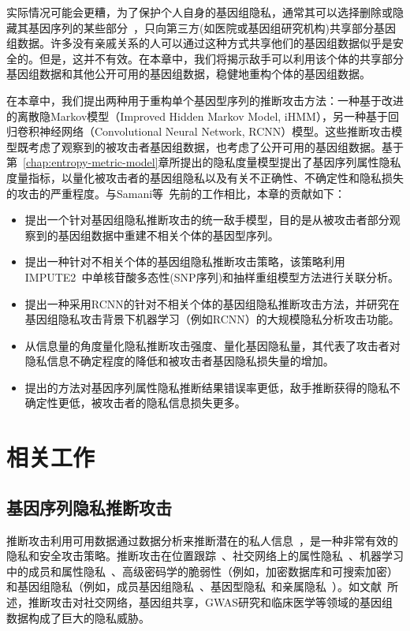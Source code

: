 实际情况可能会更糟，为了保护个人自身的基因组隐私，通常其可以选择删除或隐藏其基因序列的某些部分~\cite{shi2017overview}，只向第三方(如医院或基因组研究机构)共享部分基因组数据。许多没有亲戚关系的人可以通过这种方式共享他们的基因组数据似乎是安全的。但是，这并不有效。在本章中，我们将揭示敌手可以利用该个体的共享部分基因组数据和其他公开可用的基因组数据，稳健地重构个体的基因组数据。

在本章中，我们提出两种用于重构单个基因型序列的推断攻击方法：一种基于改进的离散隐Markov模型（Improved Hidden Markov Model, iHMM），另一种基于回归卷积神经网络（Convolutional Neural Network, RCNN）模型。这些推断攻击模型既考虑了观察到的被攻击者基因组数据，也考虑了公开可用的基因组数据。基于第~\ref{chap:entropy-metric-model}章所提出的隐私度量模型提出了基因序列属性隐私度量指标，以量化被攻击者的基因组隐私以及有关不正确性、不确定性和隐私损失的攻击的严重程度。与Samani等~\cite{samani2015quantifying}先前的工作相比，本章的贡献如下：
\begin{itemize}
	\item 提出一个针对基因组隐私推断攻击的统一敌手模型，目的是从被攻击者部分观察到的基因组数据中重建不相关个体的基因型序列。
	\item 提出一种针对不相关个体的基因组隐私推断攻击策略，该策略利用IMPUTE2~\cite{howie2009flexible}中单核苷酸多态性(SNP序列)和抽样重组模型方法进行关联分析。
	\item 提出一种采用RCNN的针对不相关个体的基因组隐私推断攻击方法，并研究在基因组隐私攻击背景下机器学习（例如RCNN）的大规模隐私分析攻击功能。
	\item 从信息量的角度量化隐私推断攻击强度、量化基因隐私量，其代表了攻击者对隐私信息不确定程度的降低和被攻击者基因隐私损失量的增加。
	\item 提出的方法对基因序列属性隐私推断结果错误率更低，敌手推断获得的隐私不确定性更低，被攻击者的隐私信息损失更多。
\end{itemize}

\section{相关工作}\label{sec:relat}
\subsection{基因序列隐私推断攻击}

推断攻击利用可用数据通过数据分析来推断潜在的私人信息~\cite{en2018inference}，是一种非常有效的隐私和安全攻击策略。推断攻击在位置跟踪~\cite{narain2016inferring}、社交网络上的属性隐私~\cite{gong2016you}、机器学习中的成员和属性隐私~\cite{shokri2017membership,ganju2018property}、高级密码学的脆弱性（例如，加密数据库和可搜索加密）~\cite{pouliot2016shadow} 和基因组隐私（例如，成员基因组隐私~\cite{wang2009learning}、基因型隐私~\cite{samani2015quantifying,he2017addressing}和亲属隐私~\cite{humbert2013addressing}）。如文献~\cite{ayday2017inference}所述，推断攻击对社交网络，基因组共享，GWAS研究和临床医学等领域的基因组数据构成了巨大的隐私威胁。

